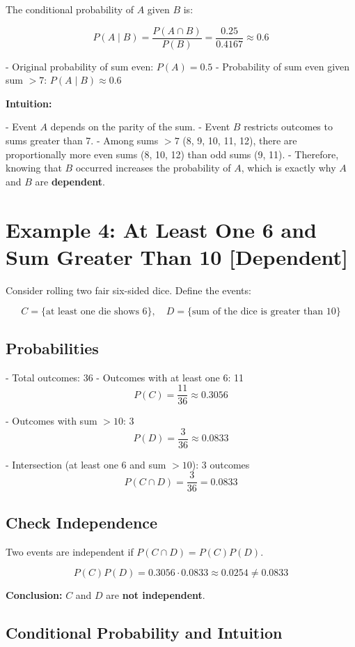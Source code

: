 \documentclass[12pt]{article}
\begin{document}
The conditional probability of \(A\) given \(B\) is:

\[
P(A \mid B) = \frac{P(A \cap B)}{P(B)} = \frac{0.25}{0.4167} \approx 0.6
\]

- Original probability of sum even: \(P(A) = 0.5\)  
- Probability of sum even given sum $>7$: \(P(A \mid B) \approx 0.6\)

\bigskip

\textbf{Intuition:}  

- Event \(A\) depends on the parity of the sum.  
- Event \(B\) restricts outcomes to sums greater than 7.  
- Among sums $>7$ (8, 9, 10, 11, 12), there are proportionally more even sums (8, 10, 12) than odd sums (9, 11).  
- Therefore, knowing that \(B\) occurred increases the probability of \(A\), which is exactly why \(A\) and \(B\) are \textbf{dependent}.


\section*{Example 4: At Least One 6 and Sum Greater Than 10 [Dependent]}

Consider rolling two fair six-sided dice. Define the events:

\[
C = \{\text{at least one die shows 6}\}, \quad
D = \{\text{sum of the dice is greater than 10}\}
\]

\subsection*{Probabilities}

- Total outcomes: 36  
- Outcomes with at least one 6: 11  
\[
P(C) = \frac{11}{36} \approx 0.3056
\]  

- Outcomes with sum $> 10$: 3  
\[
P(D) = \frac{3}{36} \approx 0.0833
\]  

- Intersection (at least one 6 and sum $>10$): 3 outcomes  
\[
P(C \cap D) = \frac{3}{36} = 0.0833
\]

\subsection*{Check Independence}

Two events are independent if \(P(C \cap D) = P(C) P(D)\).  

\[
P(C)P(D) = 0.3056 \cdot 0.0833 \approx 0.0254 \neq 0.0833
\]

\textbf{Conclusion:} \(C\) and \(D\) are \textbf{not independent}.

\subsection*{Conditional Probability and Intuition}
\end{document}
